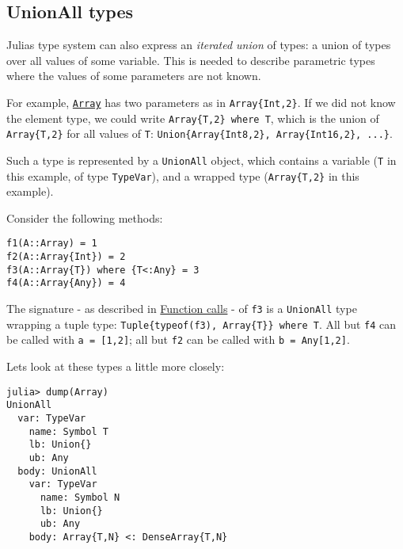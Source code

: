 \hypertarget{11911810306869937851}{}


\subsection{UnionAll types}



Julia{\textquotesingle}s type system can also express an \emph{iterated union} of types: a union of types over all values of some variable. This is needed to describe parametric types where the values of some parameters are not known.



For example, \hyperlink{15492651498431872487}{\texttt{Array}} has two parameters as in \texttt{Array\{Int,2\}}. If we did not know the element type, we could write \texttt{Array\{T,2\} where T}, which is the union of \texttt{Array\{T,2\}} for all values of \texttt{T}: \texttt{Union\{Array\{Int8,2\}, Array\{Int16,2\}, ...\}}.



Such a type is represented by a \texttt{UnionAll} object, which contains a variable (\texttt{T} in this example, of type \texttt{TypeVar}), and a wrapped type (\texttt{Array\{T,2\}} in this example).



Consider the following methods:




\begin{verbatim}
f1(A::Array) = 1
f2(A::Array{Int}) = 2
f3(A::Array{T}) where {T<:Any} = 3
f4(A::Array{Any}) = 4
\end{verbatim}



The signature - as described in \hyperlink{10803679173955542527}{Function calls} - of \texttt{f3} is a \texttt{UnionAll} type wrapping a tuple type: \texttt{Tuple\{typeof(f3), Array\{T\}\} where T}. All but \texttt{f4} can be called with \texttt{a = [1,2]}; all but \texttt{f2} can be called with \texttt{b = Any[1,2]}.



Let{\textquotesingle}s look at these types a little more closely:




\begin{verbatim}
julia> dump(Array)
UnionAll
  var: TypeVar
    name: Symbol T
    lb: Union{}
    ub: Any
  body: UnionAll
    var: TypeVar
      name: Symbol N
      lb: Union{}
      ub: Any
    body: Array{T,N} <: DenseArray{T,N}
\end{verbatim}




